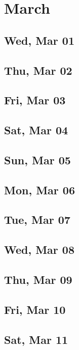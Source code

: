 \chapter{March}
	\section{Wed, Mar 01}
		
	\section{Thu, Mar 02}
		
	\section{Fri, Mar 03}
		
	\section{Sat, Mar 04}
		
	\section{Sun, Mar 05}
		
	\section{Mon, Mar 06}
		
	\section{Tue, Mar 07}
		
	\section{Wed, Mar 08}
		
	\section{Thu, Mar 09}
		
	\section{Fri, Mar 10}
		
	\section{Sat, Mar 11}
		
